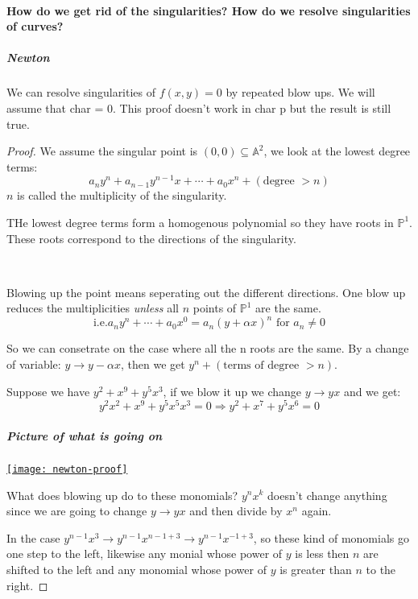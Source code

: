 \paragraph*{How do we get rid of the singularities? How do we resolve singularities of curves?}
\subparagraph*{Newton}
We can resolve singularities of $f(x,y) = 0$ by repeated blow ups. We will assume that char = $0$. This proof doesn't work in char p but the result is still true.

\begin{proof}
    We assume the singular point is $(0,0)\subseteq \mathbb{A}^2$, we look at the lowest degree terms:\[a_n y^n+ a_{n-1} y^{n-1}x+\cdots+ a_0 x^n + (\text{degree }>n)\] $n$ is called the multiplicity of the singularity.
    
    THe lowest degree terms form a homogenous polynomial so they have roots in $\mathbb{P}^1$. These roots correspond to the directions of the singularity. 

    \

    Blowing up the point means seperating out the different directions. One blow up reduces the multiplicities \textit{unless} all $n$ points of $\mathbb{P}^1$ are the same. 
    \[\text{i.e.} a_n y^n+\cdots + a_0x^0 = a_n{(y+\alpha x)}^n \text{ for }a_n\neq 0\]
    
    So we can consetrate on the case where all the n roots are the same. By a change of variable: $y\rightarrow y-\alpha x$, then we get $y^n + (\text{terms of degree }>n)$.

    \begin{example}
        Suppose we have $y^2 + x^9+y^5x^3$, if we blow it up we change $y\rightarrow yx$ and we get:\[
            y^2x^2+x^9+y^5x^5x^3 = 0 \Rightarrow y^2+x^7+y^5x^6 = 0    
        \]
    \end{example}

    \subparagraph*{Picture of what is going on}
    \begin{center}
        \href{https://youtu.be/Qhq5vwFf0kQ?t=713}{\texttt{[image: newton-proof]}}    
    \end{center}
    
    What does blowing up do to these monomials? $y^n x^k$ doesn't change anything since we are going to change $y\rightarrow yx$ and then divide by $x^n$ again.

    In the case $y^{n-1}x^3 \rightarrow y^{n-1}x^{n-1+3}\rightarrow y^{n-1}x^{-1+3}$, so these kind of monomials go one step to the left, likewise any monial whose power of $y$ is less then $n$ are shifted to the left and any monomial whose power of $y$ is greater than $n$ to the right.
    

\end{proof}
